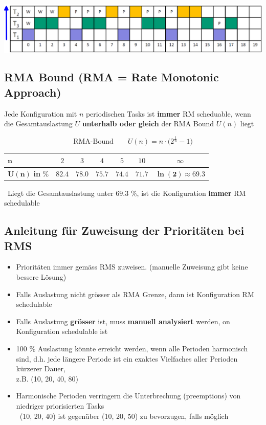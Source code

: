 \begin{center}
    \includegraphics[width=\columnwidth]{images/scheduling_RMS_example_schedule.png}
\end{center}


\subsection{RMA Bound (RMA = Rate Monotonic Approach)}

Jede Konfiguration mit $n$ periodischen Tasks ist \textbf{immer} RM scheduable, wenn die Gesamtauslastung $U$ 
\textbf{unterhalb oder gleich} der RMA Bound $U(n)$ liegt

$$ \text{RMA-Bound} \qquad U(n) = n \cdot \big( 2^{\frac{1}{n}} - 1 \big)  $$

\begin{center}
    \begin{tabular}{l cccccc}
        \toprule
        $\bm{n}$                    & $2$       & $3$       & $4$       & $5$       & $10$      & $\infty$                      \\
        \midrule
        $\bm{U(n)}$ \textbf{in} \%  & $82.4$    & $78.0$    & $75.7$    & $74.4$    & $71.7$    & $\bm{\ln(2) \approx 69.3}$    \\
        \bottomrule
    \end{tabular}
\end{center}

\textrightarrow\ Liegt die Gesamtauslastung unter $69.3$ \%, ist die Konfiguration \textbf{immer} RM schedulable


\subsection{Anleitung für Zuweisung der Prioritäten bei RMS}

\begin{itemize}
    \item Prioritäten immer gemäss RMS zuweisen. (manuelle Zuweisung gibt keine bessere Lösung)
    \item Falls Auslastung nicht grösser als RMA Grenze, dann ist Konfiguration RM schedulable
    \item Falls Auslastung \textbf{grösser} ist, muss \textbf{manuell analysiert} werden, on Konfiguration schedulable ist
    \item 100 \% Auslastung könnte erreicht werden, wenn alle Perioden harmonisch sind, d.h. jede längere Periode ist ein exaktes
        Vielfaches aller Perioden kürzerer Dauer, \\
        z.B. (10, 20, 40, 80)
    \item Harmonische Perioden verringern die Unterbrechung (preemptions) von niedriger priorisierten Tasks \\
        \textrightarrow\ (10, 20, 40) ist gegenüber (10, 20, 50) zu bevorzugen, falls möglich
\end{itemize}

